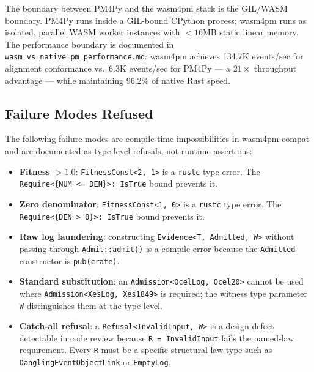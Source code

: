 The boundary between PM4Py and the wasm4pm stack is the GIL/WASM boundary.
PM4Py runs inside a GIL-bound CPython process; wasm4pm runs as isolated,
parallel WASM worker instances with $< 16$MB static linear memory. The performance
boundary is documented in \texttt{wasm\_vs\_native\_pm\_performance.md}: wasm4pm
achieves 134.7K events/sec for alignment conformance vs.\ 6.3K events/sec for
PM4Py --- a $21\times$ throughput advantage --- while maintaining 96.2\% of
native Rust speed.

\subsection{Failure Modes Refused}
\label{sec:comparisons-arch-failures}

The following failure modes are compile-time impossibilities in wasm4pm-compat
and are documented as type-level refusals, not runtime assertions:

\begin{itemize}
  \item \textbf{Fitness $> 1.0$}: \texttt{FitnessConst<2, 1>} is a \texttt{rustc}
    type error. The \texttt{Require<\{NUM <= DEN\}>: IsTrue} bound prevents it.
  \item \textbf{Zero denominator}: \texttt{FitnessConst<1, 0>} is a \texttt{rustc}
    type error. The \texttt{Require<\{DEN > 0\}>: IsTrue} bound prevents it.
  \item \textbf{Raw log laundering}: constructing \texttt{Evidence<T, Admitted, W>}
    without passing through \texttt{Admit::admit()} is a compile error because the
    \texttt{Admitted} constructor is \texttt{pub(crate)}.
  \item \textbf{Standard substitution}: an \texttt{Admission<OcelLog, Ocel20>}
    cannot be used where \texttt{Admission<XesLog, Xes1849>} is required; the
    witness type parameter \texttt{W} distinguishes them at the type level.
  \item \textbf{Catch-all refusal}: a \texttt{Refusal<InvalidInput, W>} is a
    design defect detectable in code review because \texttt{R = InvalidInput}
    fails the named-law requirement. Every \texttt{R} must be a specific structural
    law type such as \texttt{DanglingEventObjectLink} or \texttt{EmptyLog}.
\end{itemize}
